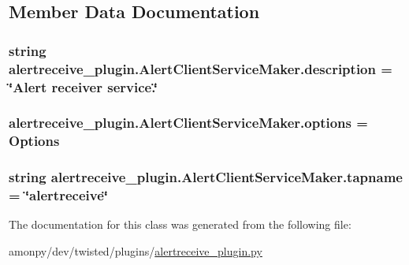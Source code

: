 \subsection{Member Data Documentation}
\hypertarget{classalertreceive__plugin_1_1_alert_client_service_maker_a1e9e4e09410f1652b9e3e64713a9ed23}{
\subsubsection[{description}]{\setlength{\rightskip}{0pt plus 5cm}string alertreceive\-\_\-plugin.\-Alert\-Client\-Service\-Maker.\-description = \char`\"{}Alert receiver service.\char`\"{}\hspace{0.3cm}{\ttfamily [static]}}}\label{classalertreceive__plugin_1_1_alert_client_service_maker_a1e9e4e09410f1652b9e3e64713a9ed23}
\hypertarget{classalertreceive__plugin_1_1_alert_client_service_maker_a602e325f18585e9ee7d01055df4c4977}{
\subsubsection[{options}]{\setlength{\rightskip}{0pt plus 5cm}alertreceive\-\_\-plugin.\-Alert\-Client\-Service\-Maker.\-options = {\bf Options}\hspace{0.3cm}{\ttfamily [static]}}}\label{classalertreceive__plugin_1_1_alert_client_service_maker_a602e325f18585e9ee7d01055df4c4977}
\hypertarget{classalertreceive__plugin_1_1_alert_client_service_maker_aa06203843a8e49cf4a4e3ce3bb0e9674}{
\subsubsection[{tapname}]{\setlength{\rightskip}{0pt plus 5cm}string alertreceive\-\_\-plugin.\-Alert\-Client\-Service\-Maker.\-tapname = \char`\"{}alertreceive\char`\"{}\hspace{0.3cm}{\ttfamily [static]}}}\label{classalertreceive__plugin_1_1_alert_client_service_maker_aa06203843a8e49cf4a4e3ce3bb0e9674}


The documentation for this class was generated from the following file\-:\begin{DoxyCompactItemize}
\item 
amonpy/dev/twisted/plugins/\hyperlink{alertreceive__plugin_8py}{alertreceive\-\_\-plugin.\-py}\end{DoxyCompactItemize}
